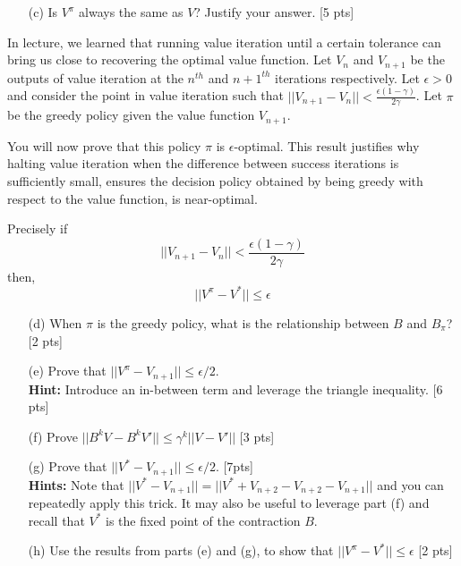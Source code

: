 \begin{enumerate}
    \item[(c)] Is $V^{\pi}$ always the same as $V$? Justify your answer. [5 pts]
\end{enumerate}

\noindent In lecture, we learned that running value iteration until a certain tolerance can bring us close to recovering the optimal value function. Let $V_{n}$ and $V_{n+1}$ be the outputs of value iteration at the $n^{th}$ and $n+1^{th}$ iterations respectively. Let  $\epsilon > 0$ and consider the point in value iteration such that $||V_{n+1} - V_{n}|| < \frac{\epsilon (1 - \gamma)}{2\gamma}$. Let $\pi$ be the greedy policy given the value function $V_{n+1}$. 

\noindent You will now prove that this policy $\pi$ is $\epsilon$-optimal. This result justifies why halting value iteration when the difference between success iterations is sufficiently small, ensures the decision policy obtained by being greedy with respect to the value function, is near-optimal. 

\noindent Precisely if 
\begin{equation}
    ||V_{n+1} - V_{n}|| < \frac{\epsilon (1 - \gamma)}{2\gamma}
\end{equation}
then, 
\begin{equation}
    ||V^{\pi} - V^{*}|| \leq \epsilon
\end{equation}


\begin{enumerate}
    \item[(d)] When $\pi$ is the greedy policy, what is the relationship between $B$ and $B_\pi$? [2 pts]
    \item[(e)] Prove that $||V^{\pi} - V_{n+1}|| \leq \epsilon /2$. \\ 
    \textbf{Hint: }Introduce an in-between term and leverage the triangle inequality. [6 pts]
    \item[(f)] Prove  $||B^kV - B^kV'|| \leq \gamma^k||V - V'||$ [3 pts]
    \item[(g)] Prove that $||V^{*} - V_{n+1}|| \leq \epsilon /2$. [7pts]\\ 
    \textbf{Hints: } Note that $||V^{*} - V_{n+1}|| = ||V^{*} + V_{n+2} - V_{n+2} - V_{n+1}||$ and you can repeatedly apply this trick. It may also be useful to leverage part (f) and recall that $V^{*}$ is the fixed point of the contraction $B$. \\
\item[(h)] Use the results from parts (e) and (g), to show that $||V^{\pi} - V^{*}|| \leq \epsilon$ [2 pts]
\end{enumerate}
